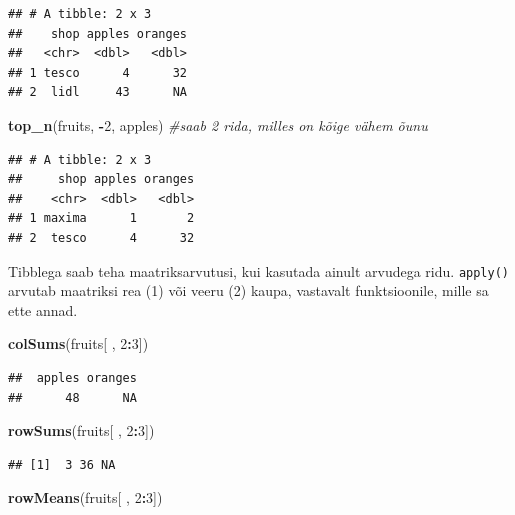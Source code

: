 \documentclass[]{book}
\newenvironment{Shaded}{\begin{snugshade}}{\end{snugshade}}
\newcommand{\KeywordTok}[1]{\textcolor[rgb]{0.13,0.29,0.53}{\textbf{#1}}}
\newcommand{\DecValTok}[1]{\textcolor[rgb]{0.00,0.00,0.81}{#1}}
\newcommand{\CommentTok}[1]{\textcolor[rgb]{0.56,0.35,0.01}{\textit{#1}}}
\newcommand{\OperatorTok}[1]{\textcolor[rgb]{0.81,0.36,0.00}{\textbf{#1}}}
\newcommand{\NormalTok}[1]{#1}
\begin{document}
\begin{verbatim}
## # A tibble: 2 x 3
##    shop apples oranges
##   <chr>  <dbl>   <dbl>
## 1 tesco      4      32
## 2  lidl     43      NA
\end{verbatim}

\begin{Shaded}
\begin{Highlighting}[]
\KeywordTok{top_n}\NormalTok{(fruits, }\OperatorTok{-}\DecValTok{2}\NormalTok{, apples) }\CommentTok{#saab 2 rida, milles on kõige vähem õunu}
\end{Highlighting}
\end{Shaded}

\begin{verbatim}
## # A tibble: 2 x 3
##     shop apples oranges
##    <chr>  <dbl>   <dbl>
## 1 maxima      1       2
## 2  tesco      4      32
\end{verbatim}

Tibblega saab teha maatriksarvutusi, kui kasutada ainult arvudega ridu.
\texttt{apply()} arvutab maatriksi rea (1) või veeru (2) kaupa,
vastavalt funktsioonile, mille sa ette annad.

\begin{Shaded}
\begin{Highlighting}[]
\KeywordTok{colSums}\NormalTok{(fruits[ , }\DecValTok{2}\OperatorTok{:}\DecValTok{3}\NormalTok{])}
\end{Highlighting}
\end{Shaded}

\begin{verbatim}
##  apples oranges 
##      48      NA
\end{verbatim}

\begin{Shaded}
\begin{Highlighting}[]
\KeywordTok{rowSums}\NormalTok{(fruits[ , }\DecValTok{2}\OperatorTok{:}\DecValTok{3}\NormalTok{])}
\end{Highlighting}
\end{Shaded}

\begin{verbatim}
## [1]  3 36 NA
\end{verbatim}

\begin{Shaded}
\begin{Highlighting}[]
\KeywordTok{rowMeans}\NormalTok{(fruits[ , }\DecValTok{2}\OperatorTok{:}\DecValTok{3}\NormalTok{])}
\end{Highlighting}
\end{Shaded}
\end{document}
